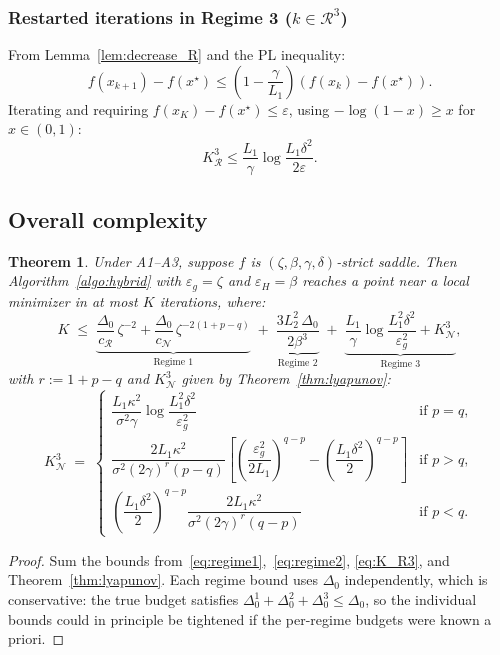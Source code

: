 \documentclass{article}
\newtheorem{theorem}{Theorem}
\begin{document}
\subsubsection{Restarted iterations in Regime 3 ($k \in \mathcal{R}^3$)}

From Lemma~\ref{lem:decrease_R} and the PL inequality:
\[
f(x_{k+1}) - f(x^\star) \leq \left(1 - \frac{\gamma}{L_1}\right)(f(x_k) - f(x^\star)).
\]
Iterating and requiring $f(x_K) - f(x^\star) \leq \varepsilon$, using $-\log(1-x) \geq x$ for $x \in (0,1)$:
\begin{equation}
\label{eq:R3}
K^3_{\mathcal{R}} \leq \frac{L_1}{\gamma}\log\frac{L_1\delta^2}{2\varepsilon}.
\end{equation}

\subsection{Overall complexity}

\begin{theorem}
\label{thm:strict_saddle}
Under A1--A3, suppose $f$ is $(\zeta,\beta,\gamma,\delta)$-strict
saddle. Then Algorithm~\ref{algo:hybrid} with $\varepsilon_g=\zeta$
and $\varepsilon_H=\beta$ reaches a point near a local minimizer in
at most $K$ iterations, where:
\begin{equation}
\label{eq:total}
K \;\leq\;
\underbrace{\frac{\Delta_0}{c_{\mathcal{R}}}\,\zeta^{-2}
+ \frac{\Delta_0}{c_{\mathcal{N}}}\,\zeta^{-2(1+p-q)}}_{\text{Regime 1}}
\;+\;
\underbrace{\frac{3L_2^2\,\Delta_0}{2\beta^3}}_{\text{Regime 2}}
\;+\;
\underbrace{\frac{L_1}{\gamma}\log\frac{L_1^2\delta^2}{\varepsilon_g^2}
+ K^3_{\mathcal{N}}}_{\text{Regime 3}},
\end{equation}
with $r:=1+p-q$ and $K^3_{\mathcal{N}}$ given by
Theorem~\ref{thm:lyapunov}:
\[
K^3_{\mathcal{N}} \;=\;
\begin{cases}
\dfrac{L_1\kappa^2}{\sigma^2\gamma}
\log\dfrac{L_1^2\delta^2}{\varepsilon_g^2}
& \text{if } p = q, \\[12pt]
\dfrac{2L_1\kappa^2}{\sigma^2(2\gamma)^r(p-q)}
\!\left[\!\left(\dfrac{\varepsilon_g^2}{2L_1}\right)^{q-p}
\!-\!\left(\dfrac{L_1\delta^2}{2}\right)^{q-p}\right]
& \text{if } p > q, \\[12pt]
\left(\dfrac{L_1\delta^2}{2}\right)^{q-p}
\dfrac{2L_1\kappa^2}{\sigma^2(2\gamma)^r(q-p)}
& \text{if } p < q.
\end{cases}
\]
\end{theorem}

\begin{proof}
Sum the bounds from~\eqref{eq:regime1},~\eqref{eq:regime2},
\eqref{eq:K_R3}, and Theorem~\ref{thm:lyapunov}. Each regime bound
uses $\Delta_0$ independently, which is conservative: the true
budget satisfies $\Delta_0^1+\Delta_0^2+\Delta_0^3\leq\Delta_0$,
so the individual bounds could in principle be tightened if the
per-regime budgets were known a priori.
\end{proof}
\end{document}
